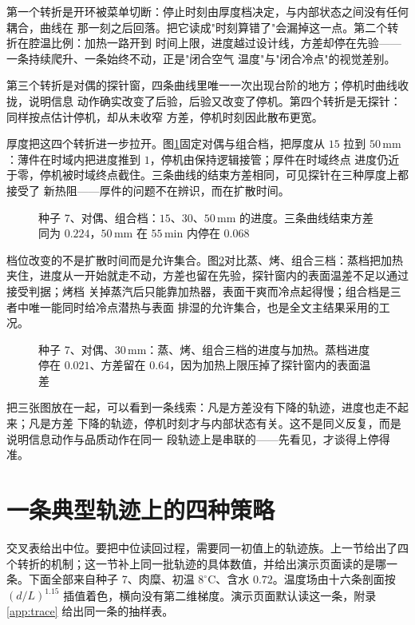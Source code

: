 第一个转折是开环被菜单切断：停止时刻由厚度档决定，与内部状态之间没有任何耦合，曲线在
那一刻之后回落。把它读成"时刻算错了"会漏掉这一点。第二个转折在腔温比例：加热一路开到
时间上限，进度越过设计线，方差却停在先验——一条持续爬升、一条始终不动，正是"闭合空气
温度"与"闭合冷点"的视觉差别。

第三个转折是对偶的探针窗，四条曲线里唯一一次出现台阶的地方；停机时曲线收拢，说明信息
动作确实改变了后验，后验又改变了停机。第四个转折是无探针：同样按点估计停机，却从未收窄
方差，停机时刻因此散布更宽。

厚度把这四个转折进一步拉开。图\ref{fig:trthick}{}固定对偶与组合档，把厚度从 \(15\) 拉到
\(50\,\mathrm{mm}\)：薄件在时域内把进度推到 \(1\)，停机由保持逻辑接管；厚件在时域终点
进度仍近于零，停机被时域终点截住。三条曲线的结束方差相同，可见探针在三种厚度上都接受了
新热阻——厚件的问题不在辨识，而在扩散时间。

\begin{figure}[htbp]
\centering
{}
\caption{种子 7、对偶、组合档：\(15\)、\(30\)、\(50\,\mathrm{mm}\) 的进度。三条曲线结束方差同为 \(0.224\)，\(50\,\mathrm{mm}\) 在 \(55\,\mathrm{min}\) 内停在 \(0.068\)}
\label{fig:trthick}
\end{figure}

档位改变的不是扩散时间而是允许集合。图\ref{fig:trcook}{}对比蒸、烤、组合三档：蒸档把加热
夹住，进度从一开始就走不动，方差也留在先验，探针窗内的表面温差不足以通过接受判据；烤档
关掉蒸汽后只能靠加热器，表面干爽而冷点起得慢；组合档是三者中唯一能同时给冷点潜热与表面
排湿的允许集合，也是全文主结果采用的工况。

\begin{figure}[htbp]
\centering
{}
\caption{种子 7、对偶、\(30\,\mathrm{mm}\)：蒸、烤、组合三档的进度与加热。蒸档进度停在 \(0.021\)、方差留在 \(0.64\)，因为加热上限压掉了探针窗内的表面温差}
\label{fig:trcook}
\end{figure}

把三张图放在一起，可以看到一条线索：凡是方差没有下降的轨迹，进度也走不起来；凡是方差
下降的轨迹，停机时刻才与内部状态有关。这不是同义反复，而是说明信息动作与品质动作在同一
段轨迹上是串联的——先看见，才谈得上停得准。

\section{一条典型轨迹上的四种策略}

交叉表给出中位。要把中位读回过程，需要同一初值上的轨迹族。上一节给出了四个转折的机制；这一节补上同一批轨迹的具体数值，并给出演示页面读的是哪一条。下面全部来自种子 7、肉糜、初温 \(8^\circ\mathrm{C}\)、含水 \(0.72\)。温度场由十六条剖面按 \((d/L)^{1.15}\) 插值着色，横向没有第二维梯度。演示页面默认读这一条，附录\ref{app:trace} 给出同一条的抽样表。

